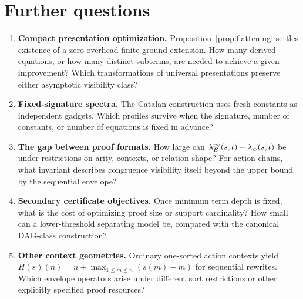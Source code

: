 \section{Further questions}

\begin{enumerate}[label=(\arabic*)]
\item \textbf{Compact presentation optimization.} Proposition~\ref{prop:flattening} settles existence of a zero-overhead finite ground extension. How many derived equations, or how many distinct subterms, are needed to achieve a given improvement? Which transformations of universal presentations preserve either asymptotic visibility class?
\item \textbf{Fixed-signature spectra.} The Catalan construction uses fresh constants as independent gadgets. Which profiles survive when the signature, number of constants, or number of equations is fixed in advance?
\item \textbf{The gap between proof formats.} How large can $\lambda^{\mathrm{rw}}_E(s,t)-\lambda_E(s,t)$ be under restrictions on arity, contexts, or relation shape? For action chains, what invariant describes congruence visibility itself beyond the upper bound by the sequential envelope?
\item \textbf{Secondary certificate objectives.} Once minimum term depth is fixed, what is the cost of optimizing proof size or support cardinality? How small can a lower-threshold separating model be, compared with the canonical DAG-class construction?
\item \textbf{Other context geometries.} Ordinary one-sorted action contexts yield $H(s)(n)=n+\max_{1\le m\le n}(s(m)-m)$ for sequential rewrites. Which envelope operators arise under different sort restrictions or other explicitly specified proof resources?
\end{enumerate}
